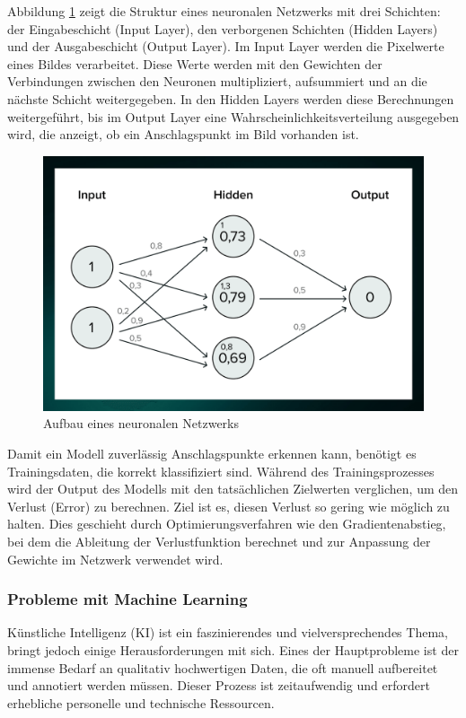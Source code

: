 Abbildung \ref{fig:network} zeigt die Struktur eines neuronalen Netzwerks mit drei Schichten: der Eingabeschicht (Input Layer), 
den verborgenen Schichten (Hidden Layers) und der Ausgabeschicht (Output Layer). Im Input Layer werden die Pixelwerte 
eines Bildes verarbeitet. Diese Werte werden mit den Gewichten der Verbindungen zwischen den Neuronen multipliziert, 
aufsummiert und an die nächste Schicht weitergegeben. In den Hidden Layers werden diese Berechnungen weitergeführt, 
bis im Output Layer eine Wahrscheinlichkeitsverteilung ausgegeben wird, die anzeigt, ob ein Anschlagspunkt im Bild 
vorhanden ist.

\begin{figure}[H]
    \centering
    \includegraphics[width=0.5\linewidth]{graphics/network.png}
    \caption{Aufbau eines neuronalen Netzwerks}
    \label{fig:network}
\end{figure}

Damit ein Modell zuverlässig Anschlagspunkte erkennen kann, benötigt es Trainingsdaten, die korrekt klassifiziert sind. 
Während des Trainingsprozesses wird der Output des Modells mit den tatsächlichen Zielwerten verglichen, um den Verlust (Error) 
zu berechnen. Ziel ist es, diesen Verlust so gering wie möglich zu halten. Dies geschieht durch Optimierungsverfahren wie den 
Gradientenabstieg, bei dem die Ableitung der Verlustfunktion berechnet und zur Anpassung der Gewichte im Netzwerk verwendet wird.



\subsubsection{Probleme mit Machine Learning}
Künstliche Intelligenz (KI) ist ein faszinierendes und vielversprechendes Thema, bringt 
jedoch einige Herausforderungen mit sich. Eines der Hauptprobleme ist der immense Bedarf 
an qualitativ hochwertigen Daten, die oft manuell aufbereitet und annotiert werden müssen. 
Dieser Prozess ist zeitaufwendig und erfordert erhebliche personelle und technische Ressourcen.

